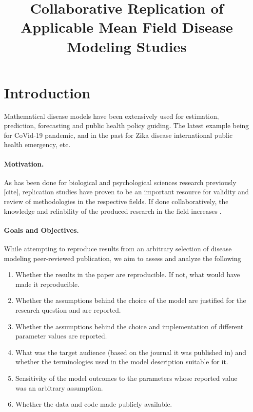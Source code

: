 \documentclass{article}
\title{Collaborative Replication of Applicable Mean Field Disease Modeling Studies}
\author{}
\date{}
\begin{document}
\maketitle

\section{Introduction}
Mathematical disease models have been extensively used for estimation, prediction, forecasting and public health policy guiding. The latest example being for CoVid-19 pandemic, and in the past for Zika disease international public health emergency, etc. \cite{paixao2016history}

\paragraph{Motivation.} As has been done for biological and psychological sciences research previously [cite], replication studies have proven to be an important resource for validity and review of methodologies in the respective fields. If done collaboratively, the knowledge and reliability of the produced research in the field increases \cite{nosek2020best}.

\paragraph{Goals and Objectives.}
While attempting to reproduce results from an arbitrary selection of disease modeling peer-reviewed publication, we aim to assess and analyze the following

\begin{enumerate}
    \item Whether the results in the paper are reproducible. If not, what would have made it reproducible.
    \item Whether the assumptions behind the choice of the model are justified for the research question and are reported.
    \item Whether the assumptions behind the choice and implementation of different parameter values are reported.
    \item What was the target audience (based on the journal it was published in) and whether the terminologies used in the model description suitable for it.
    \item Sensitivity of the model outcomes to the parameters whose reported value was an arbitrary assumption.
    \item Whether the data and code made publicly available.
\end{enumerate}
\end{document}
